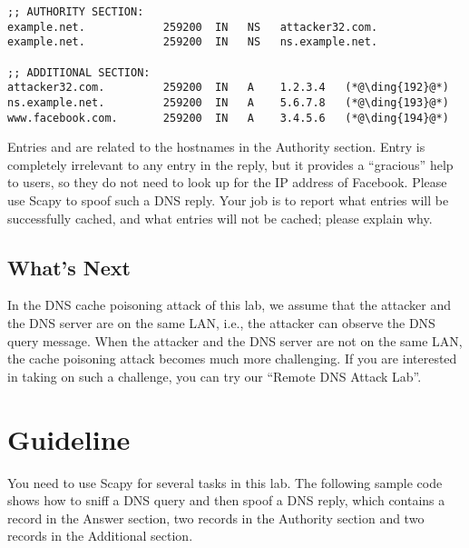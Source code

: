 \begin{lstlisting}
;; AUTHORITY SECTION:
example.net.            259200  IN   NS   attacker32.com.
example.net.            259200  IN   NS   ns.example.net.

;; ADDITIONAL SECTION:
attacker32.com.         259200  IN   A    1.2.3.4   (*@\ding{192}@*)
ns.example.net.         259200  IN   A    5.6.7.8   (*@\ding{193}@*)
www.facebook.com.       259200  IN   A    3.4.5.6   (*@\ding{194}@*)
\end{lstlisting}

Entries  and  are related to the hostnames in
the Authority section. Entry  is completely irrelevant to
any entry in the reply, but it provides a ``gracious'' help to
users, so they do not need to look up for the IP address
of Facebook. Please use Scapy to spoof such a DNS reply. Your job is
to report what entries will be successfully cached, and what entries will
not be cached; please explain why. 
 

\subsection{What's Next}


In the DNS cache poisoning attack of this lab, 
we assume that the attacker and the DNS server are on
the same LAN, i.e., the attacker can observe the DNS query message.
When the attacker and the DNS server are not on the same LAN,
the cache poisoning attack becomes much more challenging. If you
are interested in taking on such a challenge, you can 
try our ``Remote DNS Attack Lab''.




\section{Guideline}


You need to use Scapy for several tasks in this lab. The following sample code shows how to
sniff a DNS query and then spoof a DNS reply, which contains 
a record in the Answer section, two records in the Authority section and two
records in the Additional section.  


